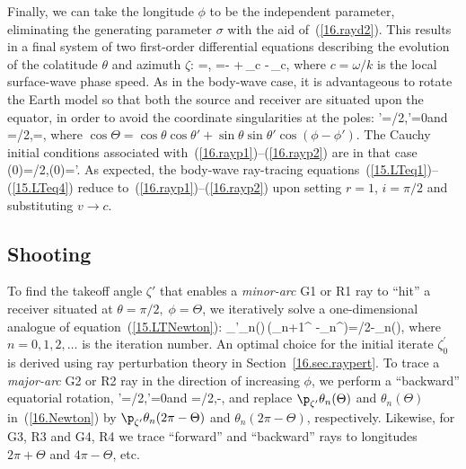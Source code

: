 Finally, we can take the longitude $\phi$ to be the
independent parameter, eliminating the generating
parameter $\sigma$ with the aid of~(\ref{16.rayd2}).
This results in a final system of two first-order
differential equations describing the evolution of
the colatitude $\theta$ and azimuth $\zeta$:
\eq \label{16.rayp1}
=\sin\theta\cot\zeta,
\en
\eq \label{16.rayp2}
=-\cos\theta
+\sin\theta\,\p_\theta\hspace{-0.3 mm}\ln c
-\cot\zeta\,\p_\phi\hspace{-0.3 mm}\ln c,
\en
where $c=\omega/k$ is the local surface-wave phase speed.
As in the body-wave case, it is advantageous to rotate
the Earth model so that both the source and receiver
are situated upon the equator, in order to avoid the
coordinate singularities at the poles:
\eq \label{16.eqrot}
\theta'=\pi/2,\;\phi'=0\quad\mbox{and}\quad
\theta=\pi/2,\;\phi=\Theta,
\en
where $\cos\Theta=\cos\theta\cos\theta'
+\sin\theta\sin\theta'\cos(\phi-\phi')$.
The Cauchy initial conditions associated
with~(\ref{16.rayp1})--(\ref{16.rayp2})
are in that case
\eq \label{16.parp}
\theta(0)=\pi/2,\qquad\zeta(0)=\zeta'.
\en
As expected, the body-wave ray-tracing
equations~(\ref{15.LTeq1})--(\ref{15.LTeq4})
reduce to~(\ref{16.rayp1})--(\ref{16.rayp2})
upon setting $r=1$, $i=\pi/2$ and substituting
$v\rightarrow c$.
%
%

\subsection{Shooting}
%
%

To find the takeoff angle $\zeta'$ that enables
%
a {\em minor-arc\/} G1 or R1 ray to ``hit'' a receiver
%
situated at $\theta=\pi/2,\;\phi=\Theta$, we
iteratively solve a one-dimensional analogue of
equation~(\ref{15.LTNewton}):
\eq \label{16.Newton}
\p_{\zeta'}\theta_n(\Theta)\,(\zeta_{n+1}^{\prime}
-\zeta_n^{\prime})=\pi/2-\theta_n(\Theta),
\en
where $n=0,1,2,\ldots$ is the iteration number.
An optimal choice for the initial iterate
$\zeta_0^{\prime}$ is derived using ray
perturbation theory in Section~\ref{16.sec.raypert}.
To trace a {\em major-arc\/} G2 or R2 ray in the
%
direction of increasing $\phi$, we perform a ``backward''
equatorial rotation,
\eq \label{16.eqrot2}
\theta'=\pi/2,\;\phi'=0\quad\mbox{and}\quad
\theta=\pi/2,\;\pi-\Theta,
\en
and replace $\p_{\zeta'}\theta_n(\Theta)$
and $\theta_n(\Theta)$ in~(\ref{16.Newton}) by
$\p_{\zeta'}\theta_n(2\pi-\Theta)$ and
$\theta_n(2\pi-\Theta)$, respectively.
Likewise, for G3, R3 and G4, R4 we
trace ``forward'' and ``backward''
rays to longitudes $2\pi+\Theta$
and $4\pi-\Theta$, etc.
%
%

